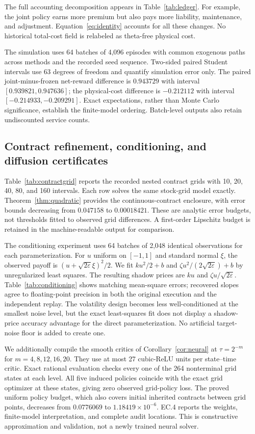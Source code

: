 The full accounting decomposition appears in Table~\ref{tab:ledger}. For example, the joint policy earns more premium but also pays more liability, maintenance, and adjustment. Equation~\ref{eq:identity} accounts for all these changes. No historical total-cost field is relabeled as theta-free physical cost.

The simulation uses 64 batches of 4,096 episodes with common exogenous paths across methods and the recorded seed sequence. Two-sided paired Student intervals use 63 degrees of freedom and quantify simulation error only. The paired joint-minus-frozen net-reward difference is $0.943729$ with interval $[0.939821,0.947636]$; the physical-cost difference is $-0.212112$ with interval $[-0.214933,-0.209291]$. Exact expectations, rather than Monte Carlo significance, establish the finite-model ordering. Batch-level outputs also retain undiscounted service counts.

\subsection{Contract refinement, conditioning, and diffusion certificates}
Table~\ref{tab:contractgrid} reports the recorded nested contract grids with 10, 20, 40, 80, and 160 intervals. Each row solves the same stock-grid model exactly. Theorem~\ref{thm:quadratic} provides the continuous-contract enclosure, with error bounds decreasing from $0.047158$ to $0.00018421$. These are analytic error budgets, not thresholds fitted to observed grid differences. A first-order Lipschitz budget is retained in the machine-readable output for comparison.

The conditioning experiment uses 64 batches of 2,048 identical observations for each parameterization. For $u$ uniform on $[-1,1]$ and standard normal $\xi$, the observed payoff is $(u+\sqrt{2\varepsilon}\xi)^2/2$. We fit $ku^2/2+b$ and $\zeta u^2/(2\sqrt{2\varepsilon})+b$ by unregularized least squares. The resulting shadow prices are $ku$ and $\zeta u/\sqrt{2\varepsilon}$. Table~\ref{tab:conditioning} shows matching mean-square errors; recovered slopes agree to floating-point precision in both the original execution and the independent replay. The volatility design becomes less well-conditioned at the smallest noise level, but the exact least-squares fit does not display a shadow-price accuracy advantage for the direct parameterization. No artificial target-noise floor is added to create one.

We additionally compile the smooth critics of Corollary~\ref{cor:neural} at $\tau=2^{-m}$ for $m=4,8,12,16,20$. They use at most 27 cubic-ReLU units per state--time critic. Exact rational evaluation checks every one of the 264 nonterminal grid states at each level. All five induced policies coincide with the exact grid optimizer at these states, giving zero observed grid-policy loss. The proved uniform policy budget, which also covers initial inherited contracts between grid points, decreases from $0.0776069$ to $1.18419\times10^{-6}$. EC.4 reports the weights, finite-model interpretation, and complete audit locations. This is constructive approximation and validation, not a newly trained neural solver.

